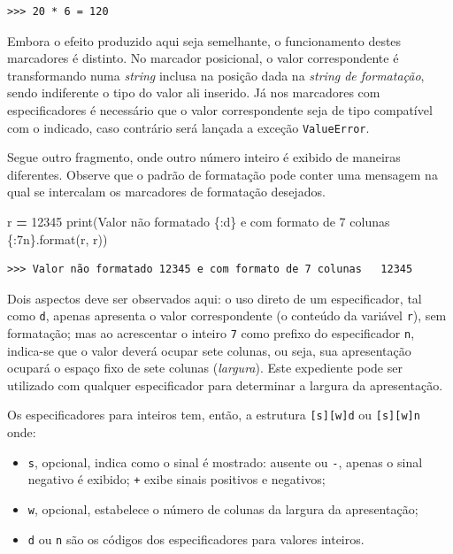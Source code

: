 \documentclass[
]{book}
\newenvironment{Shaded}{\begin{snugshade}}{\end{snugshade}}
\newcommand{\BuiltInTok}[1]{#1}
\newcommand{\DecValTok}[1]{\textcolor[rgb]{0.00,0.00,0.81}{#1}}
\newcommand{\NormalTok}[1]{#1}
\newcommand{\OperatorTok}[1]{\textcolor[rgb]{0.81,0.36,0.00}{\textbf{#1}}}
\newcommand{\SpecialCharTok}[1]{\textcolor[rgb]{0.00,0.00,0.00}{#1}}
\newcommand{\StringTok}[1]{\textcolor[rgb]{0.31,0.60,0.02}{#1}}
\providecommand{\tightlist}{%
  \setlength{\itemsep}{0pt}\setlength{\parskip}{0pt}}
\begin{document}
\begin{verbatim}
>>> 20 * 6 = 120
\end{verbatim}

Embora o efeito produzido aqui seja semelhante, o funcionamento destes marcadores é distinto. No marcador posicional, o valor correspondente é transformando numa \emph{string} inclusa na posição dada na \emph{string de formatação}, sendo indiferente o tipo do valor ali inserido. Já nos marcadores com especificadores é necessário que o valor correspondente seja de tipo compatível com o indicado, caso contrário será lançada a exceção \texttt{ValueError}.

Segue outro fragmento, onde outro número inteiro é exibido de maneiras diferentes. Observe que o padrão de formatação pode conter uma mensagem na qual se intercalam os marcadores de formatação desejados.

\begin{Shaded}
\begin{Highlighting}[]
\NormalTok{r }\OperatorTok{=} \DecValTok{12345}
\BuiltInTok{print}\NormalTok{(}\StringTok{\textquotesingle{}Valor não formatado }\SpecialCharTok{\{:d\}}\StringTok{ e com formato de 7 colunas }\SpecialCharTok{\{:7n\}}\StringTok{\textquotesingle{}}\NormalTok{.}\BuiltInTok{format}\NormalTok{(r, r))}
\end{Highlighting}
\end{Shaded}

\begin{verbatim}
>>> Valor não formatado 12345 e com formato de 7 colunas   12345
\end{verbatim}

Dois aspectos deve ser observados aqui: o uso direto de um especificador, tal como \texttt{d}, apenas apresenta o valor correspondente (o conteúdo da variável \texttt{r}), sem formatação; mas ao acrescentar o inteiro \texttt{7} como prefixo do especificador \texttt{n}, indica-se que o valor deverá ocupar sete colunas, ou seja, sua apresentação ocupará o espaço fixo de sete colunas (\emph{largura}). Este expediente pode ser utilizado com qualquer especificador para determinar a largura da apresentação.

Os especificadores para inteiros tem, então, a estrutura \texttt{{[}s{]}{[}w{]}d} ou \texttt{{[}s{]}{[}w{]}n} onde:

\begin{itemize}
\tightlist
\item
  \texttt{s}, opcional, indica como o sinal é mostrado: ausente ou \texttt{-}, apenas o sinal negativo é exibido; \texttt{+} exibe sinais positivos e negativos;
\item
  \texttt{w}, opcional, estabelece o número de colunas da largura da apresentação;
\item
  \texttt{d} ou \texttt{n} são os códigos dos especificadores para valores inteiros.
\end{itemize}
\end{document}
